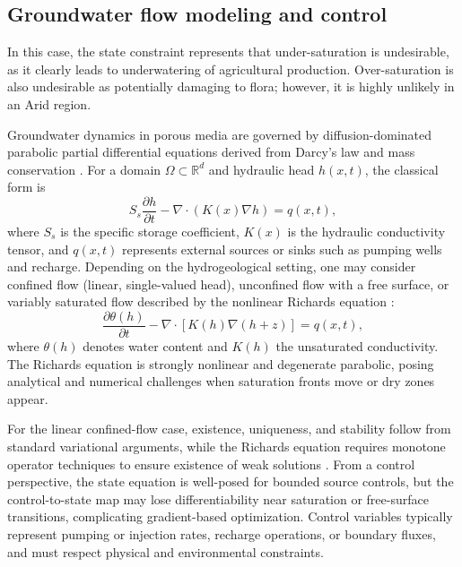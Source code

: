 \documentclass{article}
\newcommand{\1}{\mathds{1}}          %
\theoremstyle{definition}
\begin{document}
\begin{sloppypar}
\subsection{Groundwater flow modeling and control}
In this case, the state constraint represents that under-saturation is undesirable, as it clearly leads to underwatering of agricultural production. Over-saturation is also undesirable as potentially damaging to flora; however, it is highly unlikely in an Arid region. 

Groundwater dynamics in porous media are governed by diffusion-dominated parabolic partial differential equations derived from Darcy’s law and mass conservation \cite{bear1972}. For a domain $\Omega \subset \mathbb{R}^d$ and hydraulic head $h(x,t)$, the classical form is
\[
S_s \frac{\partial h}{\partial t} - \nabla \cdot (K(x)\nabla h) = q(x,t),
\]
where $S_s$ is the specific storage coefficient, $K(x)$ is the hydraulic conductivity tensor, and $q(x,t)$ represents external sources or sinks such as pumping wells and recharge. Depending on the hydrogeological setting, one may consider confined flow (linear, single-valued head), unconfined flow with a free surface, or variably saturated flow described by the nonlinear Richards equation \cite{alt1983,celia1990,helmig1997}:
\[
\frac{\partial \theta(h)}{\partial t} - \nabla \cdot [K(h)\nabla(h+z)] = q(x,t),
\]
where $\theta(h)$ denotes water content and $K(h)$ the unsaturated conductivity. The Richards equation is strongly nonlinear and degenerate parabolic, posing analytical and numerical challenges when saturation fronts move or dry zones appear.

For the linear confined-flow case, existence, uniqueness, and stability follow from standard variational arguments, while the Richards equation requires monotone operator techniques to ensure existence of weak solutions \cite{alt1983}. From a control perspective, the state equation is well-posed for bounded source controls, but the control-to-state map may lose differentiability near saturation or free-surface transitions, complicating gradient-based optimization. Control variables typically represent pumping or injection rates, recharge operations, or boundary fluxes, and must respect physical and environmental constraints. 


\end{sloppypar}
\end{document}
